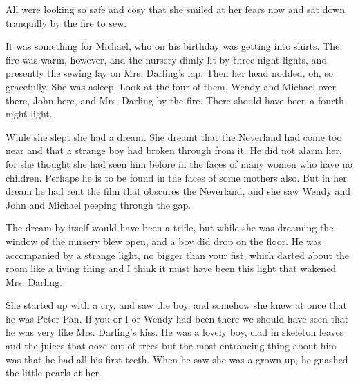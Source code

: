 All were looking so safe and cosy that she smiled at her fears now and sat down tranquilly by the fire to sew.

It was something for Michael, who on his birthday was getting into shirts.
The fire was warm, however, and the nursery dimly lit by three night-lights, and presently the sewing lay on Mrs. Darling's lap.
Then her head nodded, oh, so gracefully.
She was asleep.
Look at the four of them, Wendy and Michael over there, John here, and Mrs. Darling by the fire.
There should have been a fourth night-light.

While she slept she had a dream.
She dreamt that the Neverland had come too near and that a strange boy had broken through from it.
He did not alarm her, for she thought she had seen him before in the faces of many women who have no children.
Perhaps he is to be found in the faces of some mothers also.
But in her dream he had rent the film that obscures the Neverland, and she saw Wendy and John and Michael peeping through the gap.

The dream by itself would have been a trifle, but while she was dreaming the window of the nursery blew open, and a boy did drop on the floor.
He was accompanied by a strange light, no bigger than your fist, which darted about the room like a living thing and I think it must have been this light that wakened Mrs. Darling.

She started up with a cry, and saw the boy, and somehow she knew at once that he was Peter Pan.
If you or I or Wendy had been there we should have seen that he was very like Mrs. Darling's kiss.
He was a lovely boy, clad in skeleton leaves and the juices that ooze out of trees but the most entrancing thing about him was that he had all his first teeth.
When he saw she was a grown-up, he gnashed the little pearls at her.
